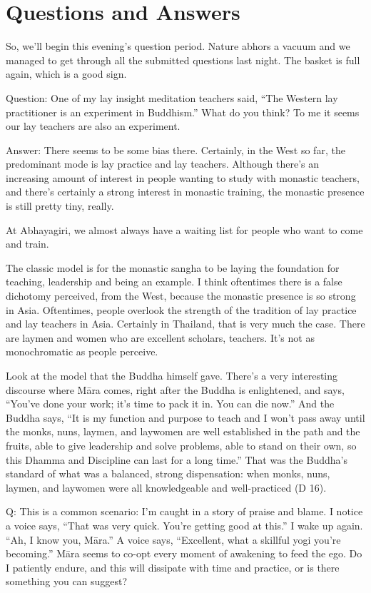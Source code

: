 \chapter{Questions and Answers}

So, we’ll begin this evening’s question period. Nature abhors a vacuum
and we managed to get through all the submitted questions last night.
The basket is full again, which is a good sign.

\qaspace
Question: One of my lay insight meditation teachers said, “The Western
lay practitioner is an experiment in Buddhism.” What do you think? To me
it seems our lay teachers are also an experiment.

\qaspace
Answer: There seems to be some bias there. Certainly, in the West so
far, the predominant mode is lay practice and lay teachers. Although
there’s an increasing amount of interest in people wanting to study with
monastic teachers, and there’s certainly a strong interest in monastic
training, the monastic presence is still pretty tiny, really.

At Abhayagiri, we almost always have a waiting list for people who want
to come and train.

The classic model is for the monastic sangha to be laying the foundation
for teaching, leadership and being an example. I think oftentimes there
is a false dichotomy perceived, from the West, because the monastic
presence is so strong in Asia. Oftentimes, people overlook the strength
of the tradition of lay practice and lay teachers in Asia. Certainly in
Thailand, that is very much the case. There are laymen and women who are
excellent scholars, teachers. It’s not as monochromatic as people
perceive.

Look at the model that the Buddha himself gave. There’s a very
interesting discourse where Māra comes, right after the Buddha is
enlightened, and says, “You’ve done your work; it's time to pack it in.
You can die now.” And the Buddha says, “It is my function and purpose to
teach and I won’t pass away until the monks, nuns, laymen, and laywomen
are well established in the path and the fruits, able to give leadership
and solve problems, able to stand on their own, so this Dhamma and
Discipline can last for a long time.” That was the Buddha’s standard of
what was a balanced, strong dispensation: when monks, nuns, laymen, and
laywomen were all knowledgeable and well-practiced (D 16).

\qaspace
Q: This is a common scenario: I’m caught in a story of praise and blame.
I notice a voice says, “That was very quick. You’re getting good at
this.” I wake up again. “Ah, I know you, Māra.” A voice says,
“Excellent, what a skillful yogi you’re becoming.” Māra seems to co-opt
every moment of awakening to feed the ego. Do I patiently endure, and
this will dissipate with time and practice, or is there something you
can suggest?

